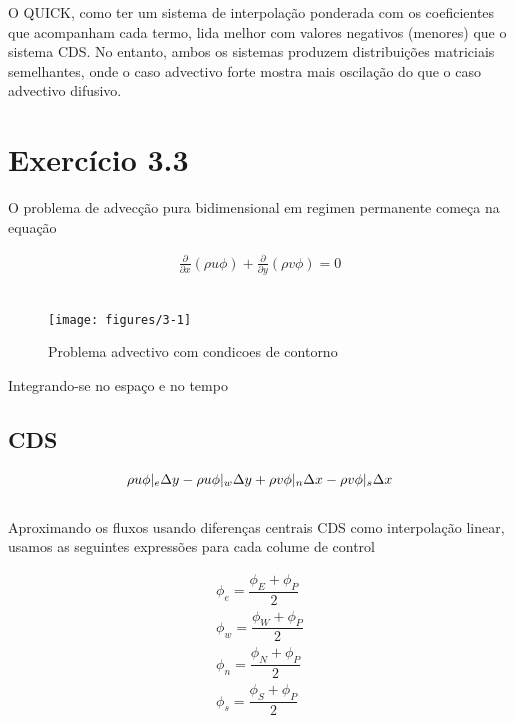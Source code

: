 \documentclass[]{article}
\begin{document}
O QUICK, como ter um sistema de interpolação ponderada com os coeficientes que acompanham cada termo, lida melhor com valores negativos (menores) que o sistema CDS. No entanto, ambos os sistemas produzem distribuições matriciais semelhantes, onde o caso advectivo forte mostra mais oscilação do que o caso advectivo difusivo.

\section*{Exercício 3.3}
O problema de advecção pura bidimensional em regimen permanente começa na equação


\begin{equation}
	\begin{aligned}
		\frac{\partial}{\partial x} (\rho u \phi) + \frac{\partial}{\partial y} (\rho v \phi) = 0
	\end{aligned}
\end{equation}\\


\begin{figure}[H]
	\centering
	\texttt{[image: figures/3-1]}
	\caption{Problema advectivo com condicoes de contorno}
\end{figure}
Integrando-se no espaço e no tempo

\subsection*{CDS}

\begin{equation}
	\begin{aligned}
		\rho u \phi\arrowvert_{e}\Delta y - \rho u \phi\arrowvert_{w}\Delta y + \rho v \phi\arrowvert_{n}\Delta x - \rho v \phi\arrowvert_{s}\Delta x 
	\end{aligned}
\end{equation}\\

Aproximando os fluxos usando diferenças centrais CDS como interpolação linear, usamos as seguintes expressões para cada colume de control

\begin{equation}
	\begin{aligned}
		\phi_{e} = \dfrac{\phi_{E} + \phi_{P}}{2} \\
		\phi_{w} = \dfrac{\phi_{W} + \phi_{P}}{2} \\
		\phi_{n} = \dfrac{\phi_{N} + \phi_{P}}{2} \\
		\phi_{s} = \dfrac{\phi_{S} + \phi_{P}}{2} \\
	\end{aligned}
\end{equation}
\end{document}
